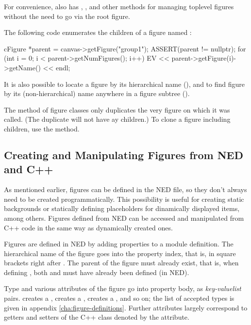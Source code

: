 For convenience,  also has ,
,  and other methods for managing
toplevel figures without the need to go via the root figure.

The following code enumerates the children of a figure named :

\begin{cpp}
cFigure *parent = canvas->getFigure("group1");
ASSERT(parent != nullptr);
for (int i = 0; i < parent->getNumFigures(); i++)
    EV << parent->getFigure(i)->getName() << endl;
\end{cpp}

It is also possible to locate a figure by its hierarchical name
(), and to find figure by its (non-hierarchical)
name anywhere in a figure subtree ().

The  method of figure classes only duplicates the very figure
on which it was called. (The duplicate will not have ay children.) To clone
a figure including children, use the  method.


\subsection{Creating and Manipulating Figures from NED and C++}
\label{sec:graphics:creating-and-manipulating-figures}

As mentioned earlier, figures can be defined in the NED file, so they
don't always need to be created programmatically. This possibility is
useful for creating static backgrounds or statically defining placeholders
for dinamically displayed items, among others. Figures defined from NED can
be accessed and manipulated from C++ code in the same way as dynamically
created ones.

Figures are defined in NED by adding  properties to a module definition.
The hierarchical name of the figure goes into the property index, that is, in
square brackets right after . The parent of the figure must
already exist, that is, when defining , both  and
 must have already been defined (in NED).

Type and various attributes of the figure go into property body, as
\textit{key-valuelist} pairs.  creates a
,  creates a
,  creates a ,
and so on; the list of accepted types is given in appendix
\ref{cha:figure-definitions}. Further attributes largely correspond to
getters and setters of the C++ class denoted by the  attribute.

